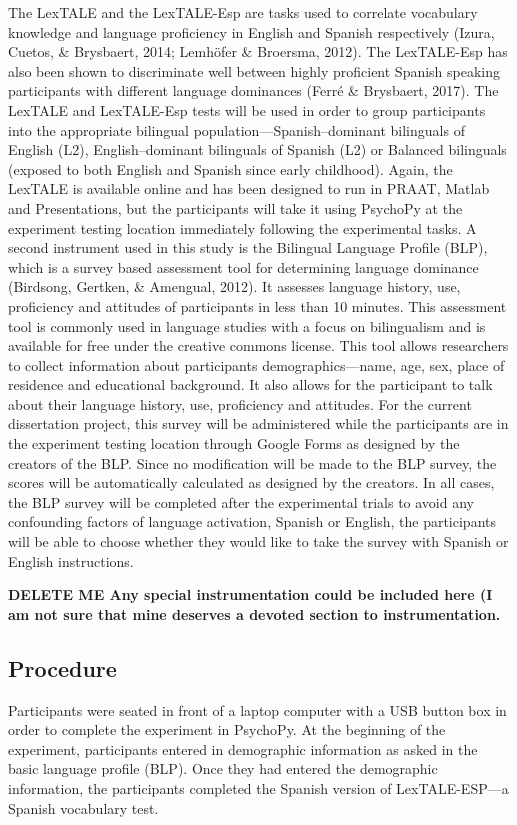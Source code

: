 The LexTALE and the LexTALE-Esp are tasks used to correlate vocabulary knowledge and language proficiency in English and Spanish respectively (Izura, Cuetos, \& Brysbaert, 2014; Lemhöfer \& Broersma, 2012). The LexTALE-Esp has also been shown to discriminate well between highly proficient Spanish speaking participants with different language dominances (Ferré \& Brysbaert, 2017). The LexTALE and LexTALE-Esp tests will be used in order to group participants into the appropriate bilingual population—Spanish–dominant bilinguals of English (L2), English–dominant bilinguals of Spanish (L2) or Balanced bilinguals (exposed to both English and Spanish since early childhood). Again, the LexTALE is available online and has been designed to run in PRAAT, Matlab and Presentations, but the participants will take it using PsychoPy at the experiment testing location immediately following the experimental tasks. 
A second instrument used in this study is the Bilingual Language Profile (BLP), which is a survey based assessment tool for determining language dominance (Birdsong, Gertken, \& Amengual, 2012). It assesses language history, use, proficiency and attitudes of participants in less than 10 minutes. This assessment tool is commonly used in language studies with a focus on bilingualism and is available for free under the creative commons license. This tool allows researchers to collect information about participants demographics—name, age, sex, place of residence and educational background. It also allows for the participant to talk about their language history, use, proficiency and attitudes. For the current dissertation project, this survey will be administered while the participants are in the experiment testing location through Google Forms as designed by the creators of the BLP. Since no modification will be made to the BLP survey, the scores will be automatically calculated as designed by the creators. In all cases, the BLP survey will be completed after the experimental trials to avoid any confounding factors of language activation, Spanish or English, the participants will be able to choose whether they would like to take the survey with Spanish or English instructions.


\textbf{DELETE ME Any special instrumentation could be included here (I am not sure that mine deserves a devoted section to instrumentation.}



\subsection{Procedure}
Participants were seated in front of a laptop computer with a USB button box in order to complete the experiment in PsychoPy. At the beginning of the experiment, participants entered in demographic information as asked in the basic language profile (BLP). Once they had entered the demographic information, the participants completed the Spanish version of LexTALE-ESP---a Spanish vocabulary test. 

